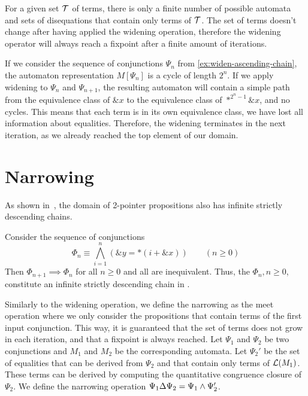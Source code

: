 For a given set $\mathcal{T}$ of terms, there is only a finite number of possible automata and sets of disequations that contain only terms of $\mathcal{T}$.
The set of terms doesn't change after having applied the widening operation, therefore the widening operator will always reach a fixpoint after a finite amount of iterations.

\begin{example}\label{ex:widen}
  If we consider the sequence of conjunctions $\Psi_n$ from \cref{ex:widen-ascending-chain}, the automaton representation $M[\Psi_n]$ is a cycle of length $2^n$.
  If we apply widening to $\Psi_n$ and $\Psi_{n+1}$, the resulting automaton will contain a simple path from the equivalence class of $\&x$ to the equivalence class of $*^{2^{n}-1}\&x$,
  and no cycles.
  This means that each term is in its own equivalence class, we have lost all information about equalities.
  Therefore, the widening terminates in the next iteration,
  as we already reached the top element of our domain.
\end{example}

\section{Narrowing}

As shown in~\cite{2pointer}, the domain of 2-pointer propositions also has infinite strictly descending chains.

\begin{example}
	Consider the sequence of conjunctions
	\[
	\Phi_n \equiv\bigwedge_{i=1}^n (\&y = *(i+\&x))\qquad(n\geq 0)
	\]
	Then $\Phi_{n+1}\implies\Phi_n$ for all $n\geq 0$ and all are inequivalent.
	Thus, the $\Phi_n,n\geq 0$, constitute an infinite strictly descending chain in \cpo.
\end{example}

Similarly to the widening operation, we define the narrowing as the meet operation where we only consider the propositions that contain terms of the first input conjunction.
This way, it is guaranteed that the set of terms does not grow in each iteration, and that a fixpoint is always reached.
Let $\Psi_1$ and $\Psi_2$ be two conjunctions and $M_1$ and $M_2$ be the corresponding automata.
Let $\Psi_2'$ be the set of equalities that can be derived from $\Psi_2$ and that contain only terms of $\mathcal{L}(M_1)$.
These terms can be derived by computing the quantitative congruence closure of $\Psi_2$.
We define the narrowing operation $\Psi_1 \Delta \Psi_2 = \Psi_1 \land \Psi_2'$.

